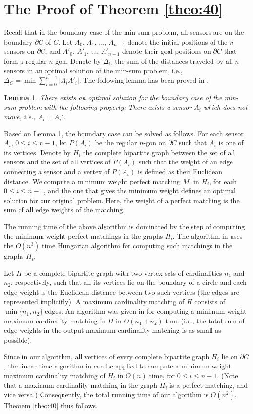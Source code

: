 \documentclass[11pt]{article}
\newtheorem{Lem}{Lemma}
\begin{document}
\section{The Proof of Theorem \ref{theo:40}}
\label{app:Theorem40}

Recall that in the boundary case of the min-sum problem, all sensors
are on the boundary $\partial C$ of $C$. Let $A_0$, $A_1$, $\ldots$, $A_{n-1}$
denote the initial positions of the $n$ sensors on $\partial C$, and
$A'_0$, $A'_1$, $\ldots$, $A'_{n-1}$ denote their goal positions on
$\partial C$ that form a regular $n$-gon. Denote by $\Delta_C$ the
sum of the distances traveled by all $n$ sensors in an optimal solution
of the min-sum problem, i.e., $\Delta_C =\min \sum_{i=0}^{n-1}
|A_{i} A'_{i}|$. The following lemma has been proved in
\cite{ref:TanNe10}.

\begin{Lem}\cite{ref:TanNe10}
\label{lem-not-move}
There exists an optimal solution for the boundary case of the
min-sum problem with the following property: There exists a sensor $A_i$ which
does not move, i.e., $A_i=A_i'$.
\end{Lem}

Based on Lemma \ref{lem-not-move}, the boundary case can be solved as
follows. For each sensor $A_i$, $0\leq i\leq n-1$, let $P(A_i)$ be
the regular $n$-gon on $\partial C$ such that $A_i$ is one of its
vertices. Denote by $H_i$ the complete bipartite graph between the
set of all sensors and the set of all vertices of $P(A_i)$ such
that the weight of an edge connecting a sensor and a vertex of
$P(A_i)$ is defined as their Euclidean distance. We compute a
minimum weight perfect matching $M_i$ in $H_i$, for each $0\leq
i\leq n-1$, and the one that gives the minimum weight defines an
optimal solution for our original problem. Here, the weight of a
perfect matching is the sum of all edge weights of the matching.

The running time of the above algorithm is dominated by the step of
computing the minimum weight perfect matchings in the graphs $H_i$.
The algorithm in \cite{ref:TanNe10} uses the $O(n^3)$ time
Hungarian algorithm for computing such matchings in the graphs $H_i$.

Let $H$ be a complete bipartite graph with two vertex sets of
cardinalities $n_1$ and $n_2$, respectively, such that all its vertices
lie on the boundary of a circle and each edge weight is the
Euclidean distance between two such vertices (the edges are
represented implicitly). A maximum cardinality matching of $H$ consists of
$\min\{n_1,n_2\}$ edges. An algorithm was given in
\cite{ref:BussLi98} for computing a
minimum weight maximum cardinality matching in $H$ in $O(n_1+n_2)$ time (i.e., the total sum
of edge weights in the output maximum cardinality matching is as small as possible).

Since in our algorithm, all vertices of every complete bipartite
graph $H_i$ lie on $\partial C$, the linear time algorithm in
\cite{ref:BussLi98} can be applied to compute a minimum weight
maximum cardinality matching of $H_i$ in $O(n)$ time, for
$0\leq i\leq n-1$. (Note that a maximum
cardinality matching in the graph $H_i$ is a perfect matching, and vice versa.)
Consequently, the total running time of our algorithm is $O(n^2)$.
Theorem \ref{theo:40} thus follows.
\end{document}
